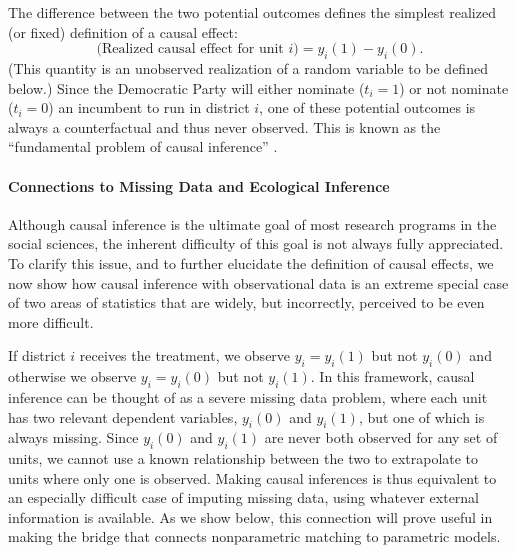 \documentclass[11pt,titlepage]{article}
\begin{document}
The difference between the two potential outcomes defines the simplest
realized (or fixed) definition of a causal effect:
\begin{equation}
  \label{rce}
  \text{(Realized causal effect for unit $i$)} = y_i(1) - y_i(0).
\end{equation}
(This quantity is an unobserved realization of a random variable to be
defined below.)  Since the Democratic Party will either nominate
($t_i=1$) or not nominate ($t_i=0$) an incumbent to run in district
$i$, one of these potential outcomes is always a counterfactual and
thus never observed. This is known as the ``fundamental problem of
causal inference'' \citep{Holland86}.

\paragraph{Connections to Missing Data and Ecological Inference}
Although causal inference is the ultimate goal of most research
programs in the social sciences, the inherent difficulty of this goal
is not always fully appreciated.  To clarify this issue, and to
further elucidate the definition of causal effects, we now show how
causal inference with observational data is an extreme special case of
two areas of statistics that are widely, but incorrectly, perceived to
be even more difficult.

If district $i$ receives the treatment, we observe $y_i=y_i(1)$ but
not $y_i(0)$ and otherwise we observe $y_i=y_i(0)$ but not $y_i(1)$.
In this framework, causal inference can be thought of as a severe
missing data problem, where each unit has two relevant dependent
variables, $y_i(0)$ and $y_i(1)$, but one of which is always missing.
Since $y_i(0)$ and $y_i(1)$ are never both observed for any set of
units, we cannot use a known relationship between the two to
extrapolate to units where only one is observed.  Making causal
inferences is thus equivalent to an especially difficult case of
imputing missing data, using whatever external information is
available.  As we show below, this connection will prove useful in
making the bridge that connects nonparametric matching to parametric
models.
\end{document}
